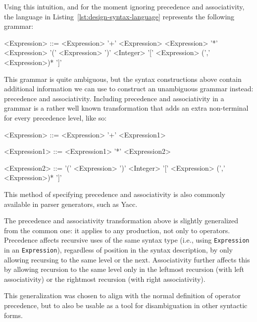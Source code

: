 \documentclass{kththesis}
\begin{document}
Using this intuition, and for the moment ignoring precedence and associativity, the language in Listing~\ref{lst:design-syntax-language} represents the following grammar:

\setlength{\grammarindent}{8em}
\begin{grammar}
<Expression> ::= <Expression> '+' <Expression>
  \alt <Expression> '*' <Expression>
  \alt '(' <Expression> ')'
  \alt <Integer>
  \alt '[' <Expression> (',' <Expression>)* ']'
\end{grammar}

This grammar is quite ambiguous, but the syntax constructions above contain additional information we can use to construct an unambiguous grammar instead: precedence and associativity. Including precedence and associativity in a grammar is a rather well known transformation that adds an extra non-terminal for every precedence level, like so:

\setlength{\grammarindent}{8em}
\begin{grammar}
<Expression> ::= <Expression> '+' <Expression1>

<Expression1> ::= <Expression1> '*' <Expression2>

<Expression2> ::= '(' <Expression> ')'
  \alt <Integer>
  \alt '[' <Expression> (',' <Expression>)* ']'
\end{grammar}

This method of specifying precedence and associativity is also commonly available in parser generators, such as Yacc.

The precedence and associativity transformation above is slightly generalized from the common one: it applies to any production, not only to operators. Precedence affects recursive uses of the same syntax type (i.e., using \texttt{Expression} in an \texttt{Expression}), regardless of position in the syntax description, by only allowing recursing to the same level or the next. Associativity further affects this by allowing recursion to the same level only in the leftmost recursion (with left associativity) or the rightmost recursion (with right associativity).

This generalization was chosen to align with the normal definition of operator precedence, but to also be usable as a tool for disambiguation in other syntactic forms.
\end{document}
